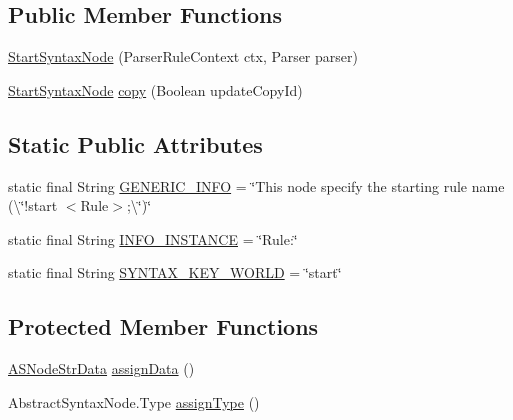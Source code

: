 \subsection*{Public Member Functions}
\begin{DoxyCompactItemize}
\item 
\hyperlink{classit_1_1emarolab_1_1cagg_1_1core_1_1language_1_1syntax_1_1abstractTree_1_1syntaxNodeType_1_1StartSyntaxNode_a91ffe92812a4688ac39d27b8fec89191}{Start\-Syntax\-Node} (Parser\-Rule\-Context ctx, Parser parser)
\item 
\hyperlink{classit_1_1emarolab_1_1cagg_1_1core_1_1language_1_1syntax_1_1abstractTree_1_1syntaxNodeType_1_1StartSyntaxNode}{Start\-Syntax\-Node} \hyperlink{classit_1_1emarolab_1_1cagg_1_1core_1_1language_1_1syntax_1_1abstractTree_1_1syntaxNodeType_1_1StartSyntaxNode_ac4873e0f86844e2adee31f17758c807b}{copy} (Boolean update\-Copy\-Id)
\end{DoxyCompactItemize}
\subsection*{Static Public Attributes}
\begin{DoxyCompactItemize}
\item 
static final String \hyperlink{classit_1_1emarolab_1_1cagg_1_1core_1_1language_1_1syntax_1_1abstractTree_1_1syntaxNodeType_1_1StartSyntaxNode_a5861bfc0e083a47fe9f5b473873b0b1e}{G\-E\-N\-E\-R\-I\-C\-\_\-\-I\-N\-F\-O} = \char`\"{}This node specify the starting rule name (\textbackslash{}\char`\"{}!start $<$Rule$>$;\textbackslash{}\char`\"{})\char`\"{}
\item 
static final String \hyperlink{classit_1_1emarolab_1_1cagg_1_1core_1_1language_1_1syntax_1_1abstractTree_1_1syntaxNodeType_1_1StartSyntaxNode_ac61b68b74b3a5baa0c997576e33e8ecb}{I\-N\-F\-O\-\_\-\-I\-N\-S\-T\-A\-N\-C\-E} = \char`\"{}Rule\-:\char`\"{}
\item 
static final String \hyperlink{classit_1_1emarolab_1_1cagg_1_1core_1_1language_1_1syntax_1_1abstractTree_1_1syntaxNodeType_1_1StartSyntaxNode_a500e0fe94e366423162597084ad190bc}{S\-Y\-N\-T\-A\-X\-\_\-\-K\-E\-Y\-\_\-\-W\-O\-R\-L\-D} = \char`\"{}start\char`\"{}
\end{DoxyCompactItemize}
\subsection*{Protected Member Functions}
\begin{DoxyCompactItemize}
\item 
\hyperlink{classit_1_1emarolab_1_1cagg_1_1core_1_1language_1_1syntax_1_1abstractTree_1_1AbstractDataFactory_1_1ASNodeStrData}{A\-S\-Node\-Str\-Data} \hyperlink{classit_1_1emarolab_1_1cagg_1_1core_1_1language_1_1syntax_1_1abstractTree_1_1syntaxNodeType_1_1StartSyntaxNode_a6d5694aa6a70c2e3e8124f78f89e95b4}{assign\-Data} ()
\item 
Abstract\-Syntax\-Node.\-Type \hyperlink{classit_1_1emarolab_1_1cagg_1_1core_1_1language_1_1syntax_1_1abstractTree_1_1syntaxNodeType_1_1StartSyntaxNode_a889432868c73bb099fbd2e93011f083e}{assign\-Type} ()
\end{DoxyCompactItemize}


